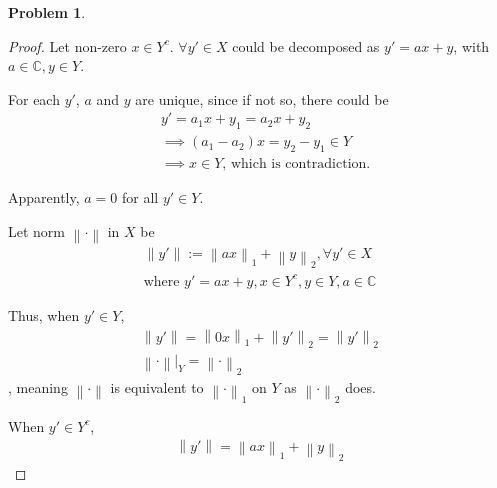 \documentclass{article}
\newcommand{\norm}[1]{\left\|#1\right\|}
\newcommand{\C}{\mathbb{C}}
\newtheorem{problem}{Problem}
\begin{document}
\begin{problem}
\end{problem}
\begin{proof}
    Let non-zero $x \in Y^c$. $\forall y' \in X$ could be decomposed as $y' = a x + y$, with $a \in \C, y \in Y$.

    For each $y'$, $a$ and $y$ are unique, since if not so, there could be
    \begin{align}
        &y' = a_1 x + y_1 = a_2 x + y_2
        \\
        &\implies
        (a_1 - a_2) x =  y_2 - y_1 \in Y
        \\
        &\implies x \in Y
        \text{, which is contradiction.}
    \end{align}

    Apparently, $a = 0$ for all $y' \in Y$.

    Let norm $\norm{\cdot}$ in $X$ be
    \begin{align}
        \norm{y'} := \norm{a x}_1 + \norm{y}_2, \forall y' \in X
        \\
        \text{where }
        y' = a x + y, 
        x \in Y^c, y \in Y, a \in \C
    \end{align}

    Thus, when $y' \in Y$,
    \begin{align}
        \norm{y'} = \norm{0 x}_1 + \norm{y'}_2 = \norm{y'}_2
        \\
        \norm{\cdot}|_Y = \norm{\cdot}_2
    \end{align}
    , meaning $\norm{\cdot}$ is equivalent to $\norm{\cdot}_1$ on $Y$ as $\norm{\cdot}_2$ does.

    When $y' \in Y^c$,
    \begin{align}
        \norm{y'} = \norm{a x}_1 + \norm{y}_2
    \end{align}


\end{proof}
\end{document}
